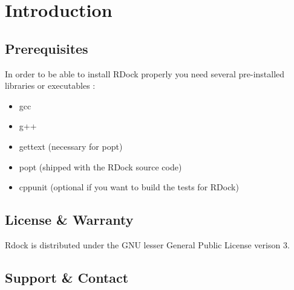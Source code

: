 \clearpage 
\section{Introduction}  \label{Introduction}
	\subsection{Prerequisites}  \label{Prerequisites}
	In order to be able to install RDock properly you need several pre-installed libraries or executables : 
	\begin{itemize}
		\item gcc
		\item g++
		\item gettext (necessary for popt)
		\item popt (shipped with the RDock source code)
		\item cppunit (optional if you want to build the tests for RDock)
	\end{itemize}
	
	\subsection{License \& Warranty}
	Rdock is distributed under the GNU lesser General Public License verison 3. 
	\subsection{Support \& Contact}
